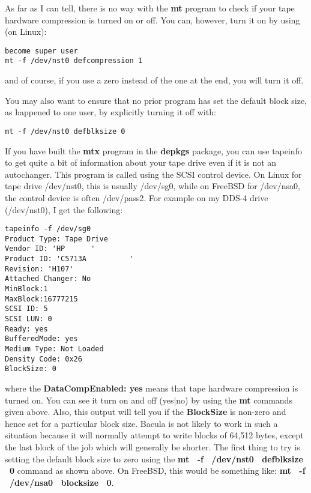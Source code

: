As far as I can tell, there is no way with the {\bf mt} program to check if
your tape hardware compression is turned on or off. You can, however, turn it
on by using (on Linux): 

\footnotesize
\begin{verbatim}
become super user
mt -f /dev/nst0 defcompression 1
\end{verbatim}
\normalsize

and of course, if you use a zero instead of the one at the end, you will turn
it off. 

You may also want to ensure that no prior program has set the default block
size, as happened to one user, by explicitly turning it off with: 

\footnotesize
\begin{verbatim}
mt -f /dev/nst0 defblksize 0
\end{verbatim}
\normalsize

If you have built the {\bf mtx} program in the {\bf depkgs} package, you can
use tapeinfo to get quite a bit of information about your tape drive even if
it is not an autochanger. This program is called using the SCSI control
device. On Linux for tape drive /dev/nst0, this is usually /dev/sg0, while on
FreeBSD for /dev/nsa0, the control device is often /dev/pass2. For example on
my DDS-4 drive (/dev/nst0), I get the following: 

\footnotesize
\begin{verbatim}
tapeinfo -f /dev/sg0
Product Type: Tape Drive
Vendor ID: 'HP      '
Product ID: 'C5713A          '
Revision: 'H107'
Attached Changer: No
MinBlock:1
MaxBlock:16777215
SCSI ID: 5
SCSI LUN: 0
Ready: yes
BufferedMode: yes
Medium Type: Not Loaded
Density Code: 0x26
BlockSize: 0             
\end{verbatim}
\normalsize

where the {\bf DataCompEnabled: yes} means that tape hardware compression is
turned on. You can see it turn on and off (yes|no) by using the {\bf mt}
commands given above. Also, this output will tell you if the {\bf BlockSize}
is non-zero and hence set for a particular block size. Bacula is not likely to
work in such a situation because it will normally attempt to write blocks of
64,512 bytes, except the last block of the job which will generally be
shorter. The first thing to try is setting the default block size to zero
using the {\bf mt \ -f \ /dev/nst0 \ defblksize \ 0} command as shown above.
On FreeBSD, this would be something like: {\bf mt \ -f \ /dev/nsa0 \ blocksize
\ 0}. 

